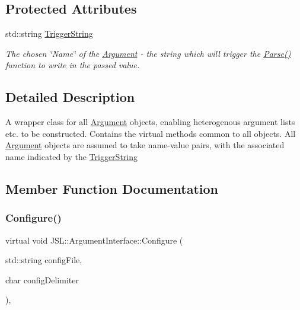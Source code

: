 \subsection*{Protected Attributes}
\begin{DoxyCompactItemize}
\item 
std\+::string \hyperlink{classJSL_1_1ArgumentInterface_afa2d1f96c4971070d3de5824f297312f}{Trigger\+String}
\begin{DoxyCompactList}\small\item\em The chosen \char`\"{}\+Name\char`\"{} of the \hyperlink{classJSL_1_1Argument}{Argument} -\/ the string which will trigger the \hyperlink{classJSL_1_1ArgumentInterface_a28b487f7a4fa6e721ed6629abe2073f2}{Parse()} function to write in the passed value. \end{DoxyCompactList}\end{DoxyCompactItemize}


\subsection{Detailed Description}
A wrapper class for all \hyperlink{classJSL_1_1Argument}{Argument} objects, enabling heterogenous argument lists etc. to be constructed. Contains the virtual methods common to all objects. All \hyperlink{classJSL_1_1Argument}{Argument} objects are assumed to take name-\/value pairs, with the associated name indicated by the \hyperlink{classJSL_1_1ArgumentInterface_afa2d1f96c4971070d3de5824f297312f}{Trigger\+String} 

\subsection{Member Function Documentation}
\mbox{\label{classJSL_1_1ArgumentInterface_aac7c3106f99c407e625b9bc6a6c8c446}} 
\subsubsection{\texorpdfstring{Configure()}{Configure()}}
{\footnotesize\ttfamily virtual void J\+S\+L\+::\+Argument\+Interface\+::\+Configure (\begin{DoxyParamCaption}\item[{std\+::string}]{config\+File,  }\item[{char}]{config\+Delimiter }\end{DoxyParamCaption})\hspace{0.3cm}{\ttfamily [inline]}, {\ttfamily [virtual]}}



